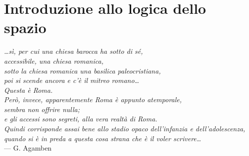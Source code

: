
\chapter{Introduzione allo logica dello spazio}
\label{cap:spazio}

\begin{flushright}{\slshape
  …sì, per cui una chiesa barocca ha sotto di sé, \\
  accessibile, una chiesa romanica, \\
  sotto la chiesa romanica una basilica paleocristiana, \\
  poi si scende ancora e c’è il mitreo romano… \\
  Questa è Roma. \\
  Però, invece, apparentemente Roma è appunto atemporale, \\
  sembra non offrire nulla; \\
  e gli accessi sono segreti, alla vera realtà di Roma. \\
  Quindi corrisponde assai bene allo stadio opaco dell’infanzia e dell’adolescenza, \\
  quando si è in preda a questa cosa strana che è il voler scrivere…} \\ \medskip
    --- G. Agamben
\end{flushright}






